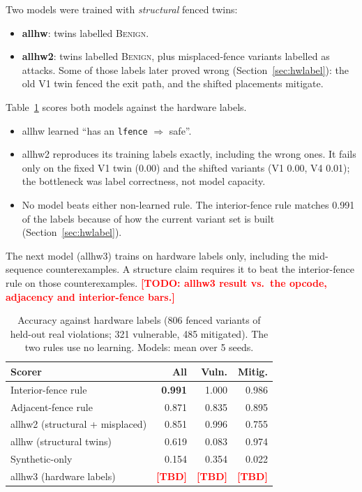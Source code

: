 \documentclass[conference]{IEEEtran}
\newcommand{\todo}[1]{\textcolor{red}{\textbf{[TODO: #1]}}}
\newcommand{\tbd}{\textcolor{red}{\textbf{[TBD]}}}
\newcommand{\cls}[1]{\textsc{#1}}
\begin{document}
Two models were trained with \emph{structural} fenced twins:
\begin{itemize}[itemsep=1pt,leftmargin=1.2em]
  \item \textbf{allhw}: twins labelled \cls{Benign}.
  \item \textbf{allhw2}: twins labelled \cls{Benign}, plus misplaced-fence
    variants labelled as attacks. Some of those labels later proved wrong
    (Section~\ref{sec:hwlabel}): the old V1 twin fenced the exit path, and
    the shifted placements mitigate.
\end{itemize}
Table~\ref{tab:hwscore} scores both models against the hardware labels.
\begin{itemize}[itemsep=1pt,leftmargin=1.2em]
  \item allhw learned ``has an \texttt{lfence} $\Rightarrow$ safe''.
  \item allhw2 reproduces its training labels exactly, including the wrong
    ones. It fails only on the fixed V1 twin (0.00) and the shifted variants
    (V1 0.00, V4 0.01); the bottleneck was label correctness, not model
    capacity.
  \item No model beats either non-learned rule. The interior-fence rule
    matches 0.991 of the labels because of how the current variant set is
    built (Section~\ref{sec:hwlabel}).
\end{itemize}
The next model (allhw3) trains on hardware labels only, including the
mid-sequence counterexamples. A structure claim requires it to beat the
interior-fence rule on those counterexamples. \todo{allhw3 result vs.\ the
opcode, adjacency and interior-fence bars.}

\begin{table}[t]
\centering
\caption{Accuracy against hardware labels (806 fenced variants of held-out
  real violations; 321 vulnerable, 485 mitigated). The two rules use no
  learning. Models: mean over 5
  seeds.}
\label{tab:hwscore}
\footnotesize
\setlength{\tabcolsep}{4pt}
\begin{tabular}{@{}lrrr@{}}
\toprule
Scorer & All & Vuln. & Mitig. \\
\midrule
Interior-fence rule & \textbf{0.991} & 1.000 & 0.986 \\
Adjacent-fence rule & 0.871 & 0.835 & 0.895 \\
allhw2 (structural + misplaced) & 0.851 & 0.996 & 0.755 \\
allhw (structural twins)            & 0.619 & 0.083 & 0.974 \\
Synthetic-only & 0.154 & 0.354 & 0.022 \\
allhw3 (hardware labels)            & \tbd & \tbd & \tbd \\
\bottomrule
\end{tabular}
\end{table}
\end{document}
